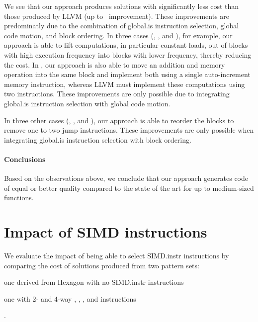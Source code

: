We see that our approach produces \glspl{solution} with significantly less
cost than those produced by \gls{LLVM} (up to~\printSpeedup{%
  \UnisonVsLlvmHexagonFiveCyclesSpeedupCyclesZeroCenteredSpeedupMax%
} improvement).
%
These improvements are predominatly due to the combination of \gls{global.is}
\gls{instruction selection}, \gls{global code motion}, and \gls{block ordering}.
%
In three cases (, , and
), for example, our approach is able to lift computations, in
particular constant loads, out of \glspl{block} with high execution frequency
into \glspl{block} with lower frequency, thereby reducing the cost.
%
In , our approach is also able to move an addition and
memory operation into the same \gls{block} and implement both using a single
auto-increment memory \gls{instruction}, whereas \gls{LLVM} must implement these
computations using two \glspl{instruction}.
%
These improvements are only possible due to integrating \gls{global.is}
\gls{instruction selection} with \gls{global code motion}.

In three other cases (, ,
and ), our approach is able to reorder the
\glspl{block} to remove one to two jump \glspl{instruction}.
%
These improvements are only possible when integrating \gls{global.is}
\gls{instruction selection} with \gls{block ordering}.


\paragraph{Conclusions}

Based on the observations above, we conclude that our approach generates code of
equal or better quality compared to the state of the art for up to medium-sized
\glspl{function}.



\section{Impact of SIMD instructions}

We evaluate the impact of being able to select \gls{SIMD.instr}
\glspl{instruction} by comparing the cost of \glspl{solution} produced from two
\glspl{pattern set}:
%
\begin{patternList}
  \item {}
    one derived from \gls{Hexagon} with no \gls{SIMD.instr} \glspl{instruction}
  \item {}
    one with \num{2}- and \num{4}-way , , ,
    and  \glspl{instruction}
\end{patternList}.


